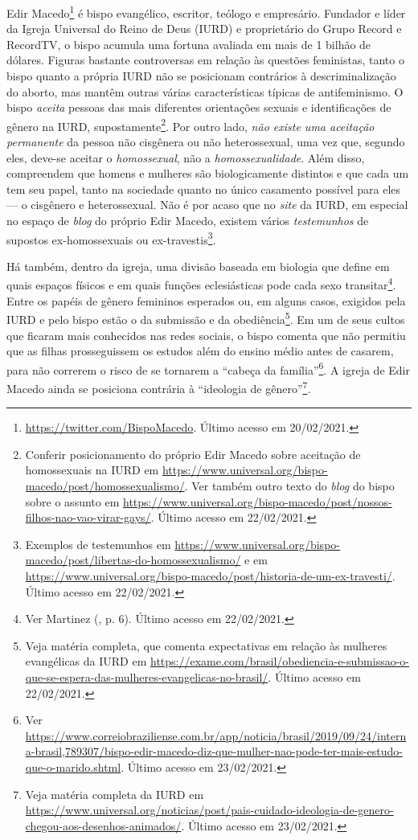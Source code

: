 \documentclass[
	12pt,				%
	openright,			%
	twoside,			%
	a4paper,			%
	english,			%
	brazil				%
	]{abntex2}
\begin{document}
\begin{anexosenv}
\begin{enumerate}
 Edir Macedo\footnote{\url{https://twitter.com/BispoMacedo}. Último acesso em 20/02/2021.} é bispo evangélico, escritor, teólogo e empresário. Fundador e líder da Igreja Universal do Reino de Deus (IURD) e proprietário do Grupo Record e RecordTV, o bispo acumula uma fortuna avaliada em mais de 1 bilhão de dólares. Figuras bastante controversas em relação às questões feministas, tanto o bispo quanto a própria IURD não se posicionam contrários à descriminalização do aborto, mas mantêm outras várias características típicas de antifeminismo. O bispo \textit{aceita} pessoas das mais diferentes orientações sexuais e identificações de gênero na IURD, supostamente\footnote{Conferir posicionamento do próprio Edir Macedo sobre aceitação de homossexuais na IURD em \url{https://www.universal.org/bispo-macedo/post/homossexualismo/}. Ver também outro texto do \textit{blog} do bispo sobre o assunto em \url{https://www.universal.org/bispo-macedo/post/nossos-filhos-nao-vao-virar-gays/}. Último acesso em 22/02/2021.}. Por outro lado, \textit{não existe uma aceitação permanente} da pessoa não cisgênera ou não heterossexual, uma vez que, segundo eles, deve-se aceitar o \textit{homossexual}, não a \textit{homossexualidade}. Além disso, compreendem que homens e mulheres são biologicamente distintos e que cada um tem seu papel, tanto na sociedade quanto no único casamento possível para eles --- o cisgênero e heterossexual. Não é por acaso que no \textit{site} da IURD, em especial no espaço de \textit{blog} do próprio Edir Macedo, existem vários \textit{testemunhos} de supostos ex-homossexuais ou ex-travestis\footnote{Exemplos de testemunhos em \url{https://www.universal.org/bispo-macedo/post/libertas-do-homossexualismo/} e em \url{https://www.universal.org/bispo-macedo/post/historia-de-um-ex-travesti/}. Último acesso em 22/02/2021.}. 
 
 Há também, dentro da igreja, uma divisão baseada em biologia que define em quais espaços físicos e em quais funções eclesiásticas pode cada sexo transitar\footnote{Ver Martinez (\citeyear{martinez2018}, p. 6). Último acesso em 22/02/2021.}. Entre os papéis de gênero femininos esperados ou, em alguns casos, exigidos pela IURD e pelo bispo estão o da submissão e da obediência\footnote{Veja matéria completa, que comenta expectativas em relação às mulheres evangélicas da IURD em \url{https://exame.com/brasil/obediencia-e-submissao-o-que-se-espera-das-mulheres-evangelicas-no-brasil/}. Último acesso em 22/02/2021.}. Em um de seus cultos que ficaram mais conhecidos nas redes sociais, o bispo comenta que não permitiu que as filhas prosseguissem os estudos além do ensino médio antes de casarem, para não correrem o risco de se tornarem a ``cabeça da família''\footnote{Ver \url{https://www.correiobraziliense.com.br/app/noticia/brasil/2019/09/24/interna-brasil,789307/bispo-edir-macedo-diz-que-mulher-nao-pode-ter-mais-estudo-que-o-marido.shtml}. Último acesso em 23/02/2021.}. A igreja de Edir Macedo ainda se posiciona contrária à ``ideologia de gênero''\footnote{Veja matéria completa da IURD em \url{https://www.universal.org/noticias/post/pais-cuidado-ideologia-de-genero-chegou-aos-desenhos-animados/}. Último acesso em 23/02/2021.}.
 

\end{enumerate}
\end{anexosenv}
\end{document}
